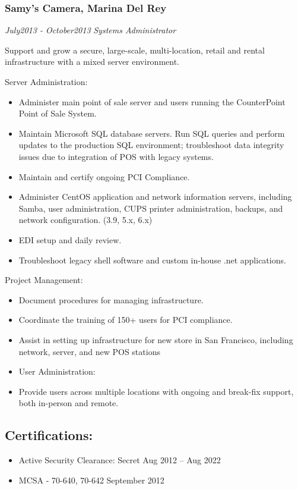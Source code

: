 \documentclass[]{article}
\providecommand{\tightlist}{%
  \setlength{\itemsep}{0pt}\setlength{\parskip}{0pt}}
\begin{document}
\subsubsection{Samy's Camera, Marina Del
Rey}\label{samys-camera-marina-del-rey}

\emph{July2013 - October2013} \emph{Systems Administrator}

Support and grow a secure, large-scale, multi-location, retail and
rental infrastructure with a mixed server environment.

Server Administration:

\begin{itemize}
\tightlist
\item
  Administer main point of sale server and users running the
  CounterPoint Point of Sale System.
\item
  Maintain Microsoft SQL database servers. Run SQL queries and perform
  updates to the production SQL environment; troubleshoot data integrity
  issues due to integration of POS with legacy systems.
\item
  Maintain and certify ongoing PCI Compliance.
\item
  Administer CentOS application and network information servers,
  including Samba, user administration, CUPS printer administration,
  backups, and network configuration. (3.9, 5.x, 6.x)
\item
  EDI setup and daily review.
\item
  Troubleshoot legacy shell software and custom in-house .net
  applications.
\end{itemize}

Project Management:

\begin{itemize}
\tightlist
\item
  Document procedures for managing infrastructure.
\item
  Coordinate the training of 150+ users for PCI compliance.
\item
  Assist in setting up infrastructure for new store in San Francisco,
  including network, server, and new POS stations
\item
  User Administration:
\item
  Provide users across multiple locations with ongoing and break-fix
  support, both in-person and remote.
\end{itemize}

\subsection{Certifications:}\label{certifications}

\begin{itemize}
\tightlist
\item
  Active Security Clearance: Secret Aug 2012 -- Aug 2022
\item
  MCSA - 70-640, 70-642 September 2012
\end{itemize}
\end{document}
